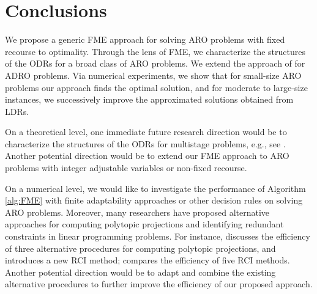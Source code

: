 \documentclass[fleqn,orsc,blindrev]{informs4}
\begin{document}
		
		\section{Conclusions} \label{sec:con}
		We propose a generic FME approach for solving ARO problems with fixed recourse to optimality. Through the lens of FME, we characterize the structures of the ODRs for a broad class of ARO problems. We extend the approach of \cite{bsz17} for ADRO problems. Via numerical experiments, we show that for small-size ARO problems our approach finds the optimal solution, and for moderate to large-size instances, we successively improve the approximated solutions obtained from LDRs. 
				
	     On a theoretical level, one immediate future research direction would be to characterize the structures of the ODRs for multistage problems, e.g., see \cite{bip10,iss13}.  {Another potential direction would be to extend our FME approach to ARO problems with integer adjustable variables or non-fixed recourse.}
		
		On a numerical level, we would like to investigate the performance of Algorithm \ref{alg:FME} with finite adaptability approaches or other decision rules on solving ARO problems.  Moreover, many researchers have proposed alternative approaches for computing polytopic projections and identifying redundant constraints in linear programming problems. For instance, \cite{hll92} discusses the efficiency of three alternative procedures for computing polytopic projections, and introduces a new RCI method; \cite{ps10} compares the efficiency of five RCI methods. Another potential direction would be to adapt and combine the existing alternative procedures to further improve the efficiency of our proposed approach.
		
		
		
\end{document}
